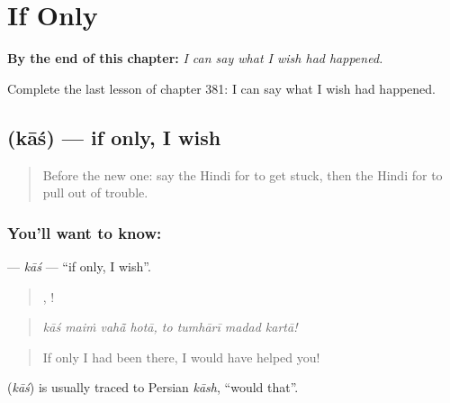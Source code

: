 
\chapter{If Only}
\label{ch:hi-if-only}

\begin{chapteropening}
\textbf{By the end of this chapter:} \emph{I can say what I wish had happened.}

Complete the last lesson of chapter 381: I can say what I wish had happened.
\end{chapteropening}

\section[\texorpdfstring{\hi{काश} (kāś)}{काश (kāś)}]{ (kāś) — if only, I wish}

\label{lesson:HI-C381-kas}



\begin{quote}
Before the new one: say the Hindi for to get stuck, then the Hindi for to pull out of trouble.
\end{quote}

\subsection*{You'll want to know: }
\textbf{} — \emph{kāś} — \textquotedblleft{}if only, I wish\textquotedblright{}.

\begin{quote}
   ,    !
\end{quote}

\begin{quote}
\emph{kāś maiṁ vahā̃ hotā, to tumhārī madad kartā!}
\end{quote}

\begin{quote}
If only I had been there, I would have helped you!
\end{quote}

\begin{cousinweb}
\textbf{} (\emph{kāś}) is usually traced to Persian \emph{kāsh}, \textquotedblleft{}would that\textquotedblright{}.
\end{cousinweb}

